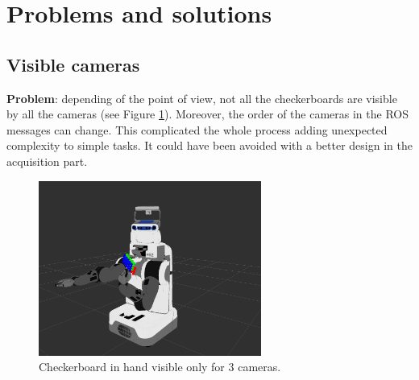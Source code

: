 
%
%


\section{Problems and solutions}

\subsection{Visible cameras}

\textbf{Problem}: depending of the point of view, not all the checkerboards are visible by all the cameras (see Figure \ref{fig:visibility}). Moreover, the order of the cameras in the ROS messages can change. This complicated the whole process adding unexpected complexity to simple tasks. It could have been avoided with a better design in the acquisition part.

\begin{figure}[!htbp]
 \centering
 \includegraphics[width=0.65\textwidth]{images/screenshots/uncalib05.png}
 \caption{Checkerboard in hand visible only for 3 cameras.}
 \label{fig:visibility}
\end{figure}

